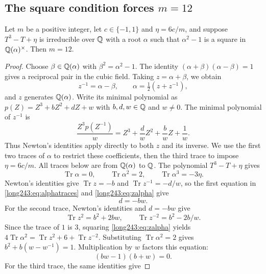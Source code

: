 \documentclass[11pt]{article}
\DeclareMathOperator{\Tr}{Tr}
\begin{document}
\subsection{The square condition forces \texorpdfstring{$m=12$}{m=12}}

\begin{lemma}\label{long243:res:scaletwelve}
Let $m$ be a positive integer, let $c\in\{-1,1\}$ and $\eta=6c/m$, and suppose $T^3-T+\eta$ is
irreducible over $\mathbb{Q}$ with a root $\alpha$ such that $\alpha^2-1$ is a square
in $\mathbb{Q}(\alpha)^\times$.  Then $m=12$.
\end{lemma}

\begin{proof}
Choose $\beta\in\mathbb{Q}(\alpha)$ with $\beta^2=\alpha^2-1$. The identity
$(\alpha+\beta)(\alpha-\beta)=1$ gives a reciprocal pair in the cubic
field. Taking $z=\alpha+\beta$, we obtain
\begin{equation}\label{long243:eq:zalpha}
 z^{-1}=\alpha-\beta,\qquad \alpha=\tfrac12(z+z^{-1}),
\end{equation}
and $z$ generates $\mathbb{Q}(\alpha)$. Write its minimal polynomial as
$p(Z)=Z^3+bZ^2+dZ+w$ with $b,d,w\in\mathbb{Q}$ and $w\ne0$. The minimal
polynomial of $z^{-1}$ is
\[
 \frac{Z^3p(Z^{-1})}{w}
   =Z^3+\frac dwZ^2+\frac bwZ+\frac1w.
\]
Thus Newton's identities apply directly to both $z$ and its inverse.
We use the first two traces of $\alpha$ to restrict these coefficients,
then the third trace to impose $\eta=6c/m$. All traces below are from
$\mathbb{Q}(\alpha)$ to $\mathbb{Q}$.
The polynomial $T^3-T+\eta$ gives
\begin{equation}\label{long243:eq:alphatraces}
 \Tr\alpha=0,\qquad \Tr\alpha^2=2,\qquad \Tr\alpha^3=-3\eta .
\end{equation}
Newton's identities give $\Tr z=-b$ and $\Tr z^{-1}=-d/w$, so the first
equation in \eqref{long243:eq:alphatraces} and \eqref{long243:eq:zalpha} give
\begin{equation}\label{long243:eq:dbw}
 d=-bw .
\end{equation}
For the second trace, Newton's identities and $d=-bw$ give
\[
 \Tr z^2=b^2+2bw,\qquad \Tr z^{-2}=b^2-2b/w.
\]
Since the trace of $1$ is $3$, squaring
\eqref{long243:eq:zalpha} yields
$4\Tr\alpha^2=\Tr z^2+6+\Tr z^{-2}$. Substituting
$\Tr\alpha^2=2$ gives $b^2+b(w-w^{-1})=1$.
Multiplication by $w$ factors this equation:
\begin{equation}\label{long243:eq:factored}
 (bw-1)(b+w)=0 .
\end{equation}
For the third trace, the same identities give

\end{proof}
\end{document}
